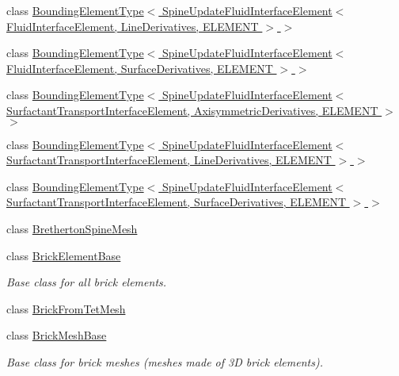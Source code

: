 \begin{DoxyCompactItemize}
\item 
class \hyperlink{classoomph_1_1BoundingElementType_3_01SpineUpdateFluidInterfaceElement_3_01FluidInterfaceElement0079ff469c68e949ddcf7a17f32ba6a9}{Bounding\+Element\+Type$<$ Spine\+Update\+Fluid\+Interface\+Element$<$ Fluid\+Interface\+Element, Line\+Derivatives, E\+L\+E\+M\+E\+N\+T $>$ $>$}
\item 
class \hyperlink{classoomph_1_1BoundingElementType_3_01SpineUpdateFluidInterfaceElement_3_01FluidInterfaceElement967a9cdd4c55a2ab80dbfbe6be84b5ab}{Bounding\+Element\+Type$<$ Spine\+Update\+Fluid\+Interface\+Element$<$ Fluid\+Interface\+Element, Surface\+Derivatives, E\+L\+E\+M\+E\+N\+T $>$ $>$}
\item 
class \hyperlink{classoomph_1_1BoundingElementType_3_01SpineUpdateFluidInterfaceElement_3_01SurfactantTransportIn96bc27501b38520de44b2adcd1d39239}{Bounding\+Element\+Type$<$ Spine\+Update\+Fluid\+Interface\+Element$<$ Surfactant\+Transport\+Interface\+Element, Axisymmetric\+Derivatives, E\+L\+E\+M\+E\+N\+T $>$ $>$}
\item 
class \hyperlink{classoomph_1_1BoundingElementType_3_01SpineUpdateFluidInterfaceElement_3_01SurfactantTransportIn1a79ed5e636f8826f4a8a00ba9f037b4}{Bounding\+Element\+Type$<$ Spine\+Update\+Fluid\+Interface\+Element$<$ Surfactant\+Transport\+Interface\+Element, Line\+Derivatives, E\+L\+E\+M\+E\+N\+T $>$ $>$}
\item 
class \hyperlink{classoomph_1_1BoundingElementType_3_01SpineUpdateFluidInterfaceElement_3_01SurfactantTransportIn0aa155ddfcfcc4520e061f144b3ee14d}{Bounding\+Element\+Type$<$ Spine\+Update\+Fluid\+Interface\+Element$<$ Surfactant\+Transport\+Interface\+Element, Surface\+Derivatives, E\+L\+E\+M\+E\+N\+T $>$ $>$}
\item 
class \hyperlink{classoomph_1_1BrethertonSpineMesh}{Bretherton\+Spine\+Mesh}
\item 
class \hyperlink{classoomph_1_1BrickElementBase}{Brick\+Element\+Base}
\begin{DoxyCompactList}\small\item\em Base class for all brick elements. \end{DoxyCompactList}\item 
class \hyperlink{classoomph_1_1BrickFromTetMesh}{Brick\+From\+Tet\+Mesh}
\item 
class \hyperlink{classoomph_1_1BrickMeshBase}{Brick\+Mesh\+Base}
\begin{DoxyCompactList}\small\item\em Base class for brick meshes (meshes made of 3D brick elements). \end{DoxyCompactList}\item 

\end{DoxyCompactItemize}
